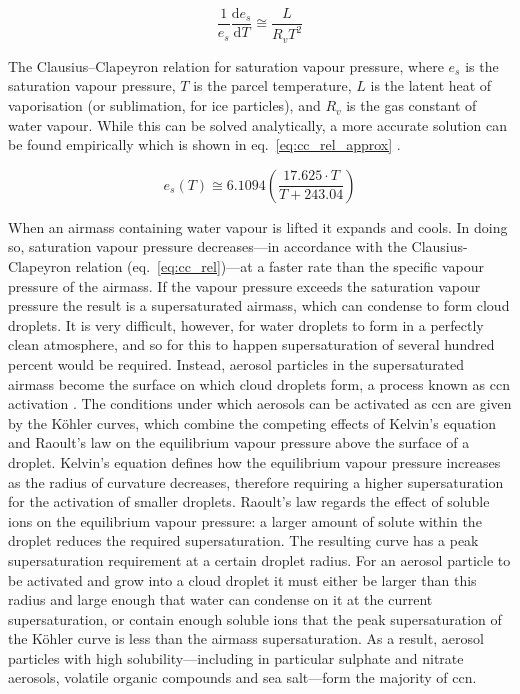 
\begin{eqfloat}
    \begin{equation} 
    \label{eq:cc_rel}
        \frac{1}{e_s}\frac{\mathrm{d} e_s}{\mathrm{d} T} \cong \frac{L}{R_v T^2}
    \end{equation}
    \caption{
    The Clausius--Clapeyron relation for saturation vapour pressure, where $e_s$ is the saturation vapour pressure, $T$ is the parcel temperature, $L$ is the latent heat of vaporisation (or sublimation, for ice particles), and $R_v$ is the gas constant of water vapour. While this can be solved analytically, a more accurate solution can be found empirically which is shown in eq.~\ref{eq:cc_rel_approx} \citep{alduchov_improved_1997}.
    }
    \begin{equation}
    \label{eq:cc_rel_approx}
        e_s\left ( T \right ) \cong 6.1094 \left ( \frac{17.625\cdot T}{T + 243.04} \right )
    \end{equation}
\end{eqfloat}

When an airmass containing water vapour is lifted it expands and cools.
In doing so, saturation vapour pressure decreases---in accordance with the Clausius-Clapeyron relation (eq.~\ref{eq:cc_rel})---at a faster rate than the specific vapour pressure of the airmass. 
If the vapour pressure exceeds the saturation vapour pressure the result is a supersaturated airmass, which can condense to form cloud droplets.
It is very difficult, however, for water droplets to form in a perfectly clean atmosphere, and so for this to happen supersaturation of several hundred percent would be required.
Instead, aerosol particles in the supersaturated airmass become the surface on which cloud droplets form, a process known as \acrfull{ccn} activation \citep{acci}.
The conditions under which aerosols can be activated as \acrshort{ccn} are given by the K{\"o}hler curves, which combine the competing effects of Kelvin's equation and Raoult's law on the equilibrium vapour pressure above the surface of a droplet. 
Kelvin's equation defines how the equilibrium vapour pressure increases as the radius of curvature decreases, therefore requiring a higher supersaturation for the activation of smaller droplets. 
Raoult's law regards the effect of soluble ions on the equilibrium vapour pressure: a larger amount of solute within the droplet reduces the required supersaturation. The resulting curve has a peak supersaturation requirement at a certain droplet radius. 
For an aerosol particle to be activated and grow into a cloud droplet it must either be larger than this radius and large enough that water can condense on it at the current supersaturation, or contain enough soluble ions that the peak supersaturation of the K{\"o}hler curve is less than the airmass supersaturation.
As a result, aerosol particles with high solubility---including in particular sulphate and nitrate aerosols, volatile organic compounds and sea salt---form the majority of \acrshort{ccn}.

